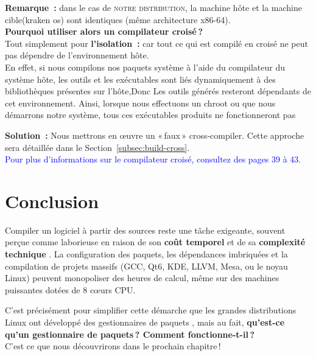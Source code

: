 
\textbf{Remarque :} dans le cas de \textsc{notre distribution}, la machine hôte  et la machine cible(kraken os) sont identiques (même architecture x86-64).\\
\textbf{Pourquoi utiliser alors un compilateur croisé ?}\\
Tout simplement pour \textbf{l’isolation  :}  car  tout ce qui est compilé en croisé ne peut pas dépendre de l’environnement hôte.\\
En effet, si nous compilons nos paquets système à l’aide du compilateur du système hôte, les outils et les exécutables sont liés dynamiquement à des bibliothèques présentes sur l’hôte,Donc Les outils générés resteront dépendants de cet environnement. Ainsi, lorsque nous effectuons un chroot ou que nous démarrons notre système, tous ces exécutables produits ne fonctionneront pas

\medskip
\noindent
\textbf{Solution :}  
Nous mettrons en œuvre un « faux » cross‑compiler. Cette approche sera détaillée dans le  Section~\textcolor{blue}{\ref{subsec:build-cross}}.\\

\textcolor{blue}{Pour plus d’informations sur le compilateur croisé, consultez \cite{lfs_book} des pages 39 à 43.}  
\section{Conclusion }

Compiler un logiciel à partir des sources reste une tâche exigeante, souvent perçue comme laborieuse en raison de son \textbf{coût temporel} et de sa \textbf{complexité technique} . La configuration des paquets, les dépendances imbriquées et la compilation de projets massifs (GCC, Qt6, KDE, LLVM, Mesa, ou le noyau Linux) peuvent monopoliser des heures de calcul, même sur des machines puissantes dotées de 8 cœurs CPU.

C’est précisément pour simplifier cette démarche que les grandes distributions Linux ont développé des gestionnaires de paquets ,  mais au fait, \textbf{qu’est-ce qu’un gestionnaire de paquets ? Comment fonctionne-t-il ? }\\

C’est ce que nous découvrirons dans le prochain chapitre !